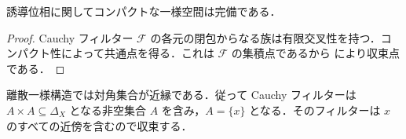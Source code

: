 \begin{prop}[コンパクト一様空間の完備性]
誘導位相に関してコンパクトな一様空間は完備である．
\end{prop}
\begin{proof}
Cauchy フィルター $\mathcal F$ の各元の閉包からなる族は有限交叉性を持つ．コンパクト性によって共通点を得る．これは $\mathcal F$ の集積点であるから  により収束点である．
\end{proof}
\begin{prop}[離散一様空間の完備性]
離散一様構造では対角集合が近縁である．従って Cauchy フィルターは $A\times A\subseteq\Delta_X$ となる非空集合 $A$ を含み，$A=\{x\}$ となる．そのフィルターは $x$ のすべての近傍を含むので収束する．
\end{prop}
